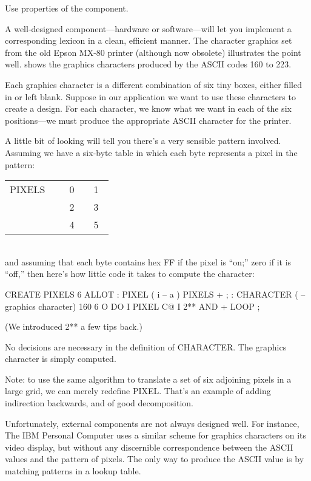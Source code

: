 \begin{tip}
Use properties of the component.
\end{tip}
A well-designed component---hardware or software---will let you implement
a corresponding lexicon in a clean, efficient manner. The character
graphics set from the old Epson MX-80 printer (although now obsolete)
illustrates the point well.  shows the graphics characters
produced by the ASCII codes 160 to 223.



Each graphics character is a different combination of six tiny boxes,
either filled in or left blank. Suppose in our application we want to use
these characters to create a design. For each character, we know what we
want in each of the six positions---we must produce the appropriate
ASCII character for the printer.

A little bit of looking will tell you there's a very sensible pattern
involved. Assuming we have a six-byte table in which each byte represents
a pixel in the pattern:

\bigskip
{\sf\begin{tabular}{l|c|c|} \cline{2-3}
PIXELS~~ & ~0~ & ~1~ \\ \cline{2-3}
       & 2 & 3 \\ \cline{2-3}
       & 4 & 5 \\ \cline{2-3}
\end{tabular}}\\[1ex]
and assuming that each byte contains hex FF if the pixel is ``on;'' zero if
it is ``off,'' then here's how little code it takes to compute the character:

\begin{Code}
CREATE PIXELS  6 ALLOT
: PIXEL  ( i -- a )  PIXELS + ;
: CHARACTER  ( -- graphics character)
   160   6 O DO  I PIXEL C@  I 2** AND  +  LOOP ;
\end{Code}
(We introduced 2** a few tips back.)

No decisions are necessary in the definition of CHARACTER. The
graphics character is simply computed.

Note: to use the same algorithm to translate a set of six adjoining
pixels in a large grid, we can merely redefine PIXEL. That's an example
of adding indirection backwards, and of good decomposition.

Unfortunately, external components are not always designed well.
For instance, The IBM Personal Computer uses a similar scheme for
graphics characters on its video display, but without any discernible
correspondence between the ASCII values and the pattern of pixels. The
only way to produce the ASCII value is by matching patterns in a lookup
table.

